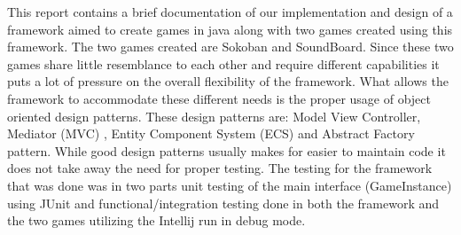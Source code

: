 \documentclass[main.tex]{subfiles}
\begin{document}
This report contains a brief documentation of our implementation and design of a framework aimed to create games in java along with two games created using this framework. The two games created are Sokoban and SoundBoard. Since these two games share little resemblance to each other and require different capabilities it puts a lot of pressure on the overall flexibility of the framework. What allows the framework to accommodate these different needs is the proper usage of object oriented design patterns. These design patterns are: Model View Controller, Mediator (MVC) , Entity Component System (ECS) and Abstract Factory pattern. While good design patterns usually makes for easier to maintain code it does not take away the need for proper testing. The testing for the framework that was done was in two parts unit testing of the main interface (GameInstance) using JUnit and functional/integration testing done in both the framework and the two games utilizing the Intellij run in debug mode.
\end{document}

